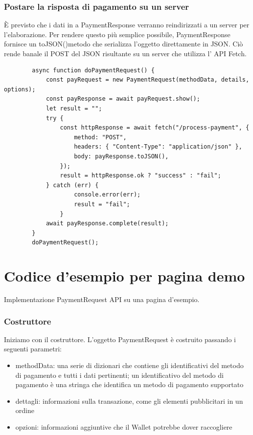 \documentclass[italian]{article}
\begin{document}
	\subsubsection{Postare la risposta di pagamento su un server}
	È previsto che i dati in a PaymentResponse verranno reindirizzati a un server per l'elaborazione. Per rendere questo più semplice possibile, PaymentResponse fornisce un toJSON()metodo che serializza l'oggetto direttamente in JSON. Ciò rende banale il POST del JSON risultante su un server che utilizza l' API Fetch.
	
	\pagebreak
	\begin{lstlisting}
		async function doPaymentRequest() {
			const payRequest = new PaymentRequest(methodData, details, options);
			const payResponse = await payRequest.show();
			let result = "";
			try {
				const httpResponse = await fetch("/process-payment", {
					method: "POST",
					headers: { "Content-Type": "application/json" },
					body: payResponse.toJSON(),
				});
				result = httpResponse.ok ? "success" : "fail";
			} catch (err) {
					console.error(err);
					result = "fail";
				}
			await payResponse.complete(result);
		}
		doPaymentRequest();
	\end{lstlisting}
	
	\section{Codice d'esempio per pagina demo}
	Implementazione PaymentRequest API su una pagina d'esempio.
	\subsubsection{Costruttore}
	Iniziamo con il costruttore. L'oggetto PaymentRequest è costruito passando i seguenti parametri:
	\begin{itemize}
	\item methodData: una serie di dizionari che contiene gli identificativi del metodo di pagamento e tutti i dati pertinenti; un identificativo del metodo di pagamento è una stringa che identifica un metodo di pagamento supportato
	\item dettagli: informazioni sulla transazione, come gli elementi pubblicitari in un ordine
	\item opzioni: informazioni aggiuntive che il Wallet potrebbe dover raccogliere
	\end{itemize}
\end{document}
